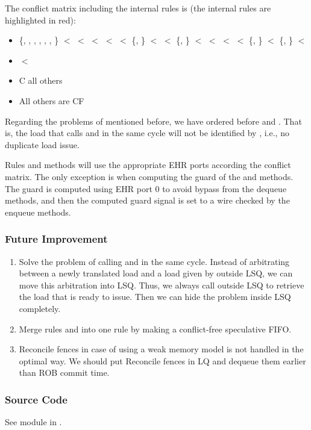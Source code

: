 The conflict matrix including the internal rules is (the internal rules are highlighted in red):
\begin{itemize}
    \item \{, , , , , , \textcolor{red}{}\} $<$  $<$ \textcolor{red}{} $<$  $<$  $<$ \{, \} $<$ \textcolor{red}{} $<$ \{, \} $<$  $<$  $<$  $<$ \{, \} $<$ \{, \} $<$ 
    \item {} $<$ 
    \item {} C all others
    \item All others are CF
\end{itemize}
Regarding the problems of  mentioned before, we have ordered  before  and .
That is, the load that calls  and  in the same cycle will not be identified by , i.e., no duplicate load issue.

Rules and methods will use the appropriate EHR ports according the conflict matrix.
The only exception is when computing the guard of the  and  methods.
The guard is computed using EHR port 0 to avoid bypass from the dequeue methods, and then the computed guard signal is set to a wire checked by the enqueue methods.

\subsubsection{Future Improvement}

\begin{enumerate}
    \item Solve the problem of calling  and  in the same cycle.
    Instead of arbitrating between a newly translated load and a load given by  outside LSQ, we can move this arbitration into LSQ.
    Thus, we always call  outside LSQ to retrieve the load that is ready to issue.
    Then we can hide the problem inside LSQ completely.
    
    \item Merge rules  and  into one rule by making  a conflict-free speculative FIFO.
    
    \item Reconcile fences in case of using a weak memory model is not handled in the optimal way.
    We should put Reconcile fences in LQ and dequeue them earlier than ROB commit time.
\end{enumerate}

\subsubsection{Source Code}
See module  in .
